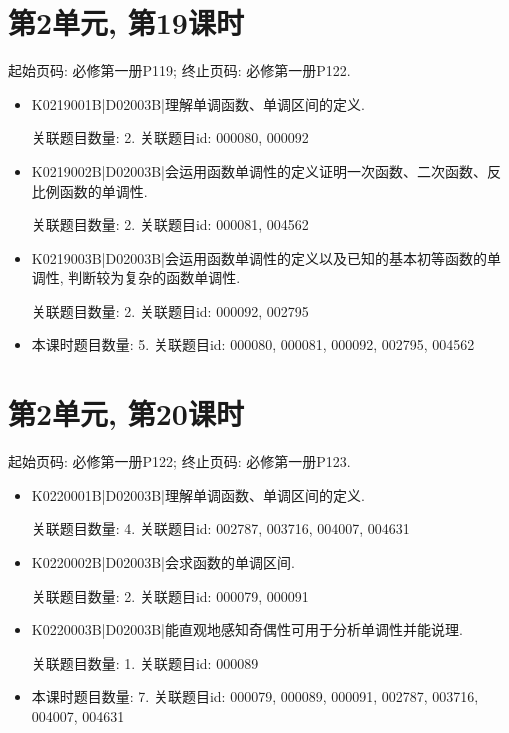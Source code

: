 \section*{第2单元, 第19课时}
起始页码: 必修第一册P119; 终止页码: 必修第一册P122.
\begin{itemize}
\item K0219001B|D02003B|理解单调函数、单调区间的定义.

关联题目数量: 2. 关联题目id: 000080, 000092

\item K0219002B|D02003B|会运用函数单调性的定义证明一次函数、二次函数、反比例函数的单调性.

关联题目数量: 2. 关联题目id: 000081, 004562

\item K0219003B|D02003B|会运用函数单调性的定义以及已知的基本初等函数的单调性, 判断较为复杂的函数单调性.

关联题目数量: 2. 关联题目id: 000092, 002795

\item 本课时题目数量: 5. 关联题目id: 000080, 000081, 000092, 002795, 004562

\end{itemize}

\section*{第2单元, 第20课时}
起始页码: 必修第一册P122; 终止页码: 必修第一册P123.
\begin{itemize}
\item K0220001B|D02003B|理解单调函数、单调区间的定义.

关联题目数量: 4. 关联题目id: 002787, 003716, 004007, 004631

\item K0220002B|D02003B|会求函数的单调区间.

关联题目数量: 2. 关联题目id: 000079, 000091

\item K0220003B|D02003B|能直观地感知奇偶性可用于分析单调性并能说理.

关联题目数量: 1. 关联题目id: 000089

\item 本课时题目数量: 7. 关联题目id: 000079, 000089, 000091, 002787, 003716, 004007, 004631

\end{itemize}

